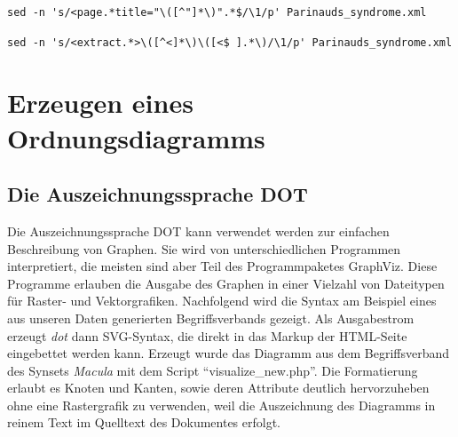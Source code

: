 \documentclass[pagesize,paper=A4,DIV=calc,fontsize=12pt,draft=false]{scrreprt}
\begin{document}
\lstset{
language=bash
}

\begin{lstlisting}[caption={Extraktion des Titels aus Zeile 5 des Artikels \enquote{Parinaud's syndrome}. HTML-Entities wie \texttt{\&\#39;} für hochgestellte einzelne Anführungszeichen in Zeile 5 wurden gesammelt und in der Ergebnisdatei in einem Durchgang ersetzt.}]
sed -n 's/<page.*title="\([^"]*\)".*$/\1/p' Parinauds_syndrome.xml
\end{lstlisting}

\begin{lstlisting}[caption={Extraktion des Textes aus der der Zeile 10 nachfolgenden Zeile des Artikels \enquote{Parinaud's syndrome}}]
sed -n 's/<extract.*>\([^<]*\)\([<$ ].*\)/\1/p' Parinauds_syndrome.xml
\end{lstlisting}




\section{Erzeugen eines Ordnungsdiagramms}

\subsection{Die Auszeichnungssprache DOT}

Die Auszeichnungssprache DOT kann verwendet werden zur einfachen Beschreibung von Graphen.
Sie wird von unterschiedlichen Programmen interpretiert, die meisten sind aber Teil des Programmpaketes GraphViz.
Diese Programme erlauben die Ausgabe des Graphen in einer Vielzahl von Dateitypen für Raster- und Vektorgrafiken.
Nachfolgend wird die Syntax am Beispiel eines aus unseren Daten generierten Begriffsverbands gezeigt.
Als Ausgabestrom erzeugt \emph{dot} dann SVG-Syntax, die direkt in das Markup der HTML-Seite eingebettet werden kann.
Erzeugt wurde das Diagramm aus dem Begriffsverband des Synsets \emph{Macula} mit dem Script \enquote{visualize\_new.php}. 
Die Formatierung erlaubt es Knoten und Kanten, sowie deren Attribute deutlich hervorzuheben ohne eine Rastergrafik zu verwenden, weil die Auszeichnung des Diagramms in reinem Text im Quelltext des Dokumentes erfolgt.
\end{document}
